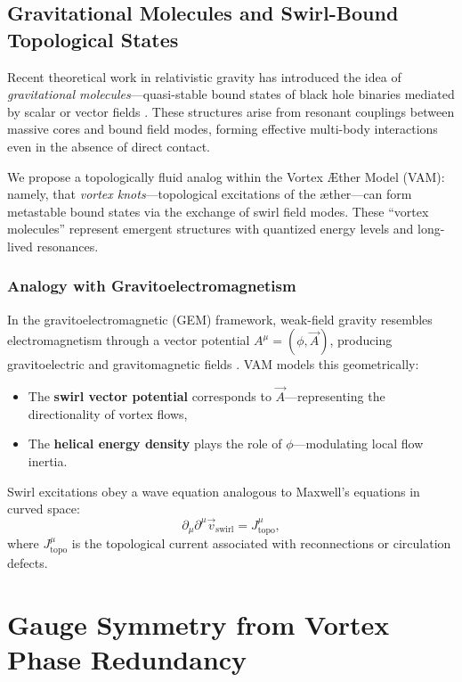 \subsection{Gravitational Molecules and Swirl-Bound Topological States}

Recent theoretical work in relativistic gravity has introduced the idea of \textit{gravitational molecules}—quasi-stable bound states of black hole binaries mediated by scalar or vector fields \cite{baumann2023black}. These structures arise from resonant couplings between massive cores and bound field modes, forming effective multi-body interactions even in the absence of direct contact.

We propose a topologically fluid analog within the Vortex Æther Model (VAM): namely, that \textit{vortex knots}—topological excitations of the æther—can form metastable bound states via the exchange of swirl field modes. These ``vortex molecules'' represent emergent structures with quantized energy levels and long-lived resonances.

\subsubsection*{Analogy with Gravitoelectromagnetism}

In the gravitoelectromagnetic (GEM) framework, weak-field gravity resembles electromagnetism through a vector potential $A^\mu = (\phi, \vec{A})$, producing gravitoelectric and gravitomagnetic fields \cite{mashhoon2001gravito}. VAM models this geometrically:
\begin{itemize}
    \item The \textbf{swirl vector potential} corresponds to $\vec{A}$—representing the directionality of vortex flows,
    \item The \textbf{helical energy density} plays the role of $\phi$—modulating local flow inertia.
\end{itemize}

Swirl excitations obey a wave equation analogous to Maxwell’s equations in curved space:
\begin{equation}
\partial_\mu \partial^\mu \vec{v}_\text{swirl} = J^\mu_{\text{topo}},
\end{equation}
where $J^\mu_{\text{topo}}$ is the topological current associated with reconnections or circulation defects.

\section*{Gauge Symmetry from Vortex Phase Redundancy}

